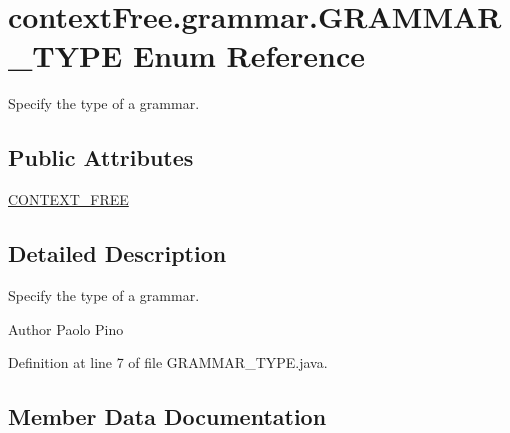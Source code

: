 \hypertarget{enumcontext_free_1_1grammar_1_1_g_r_a_m_m_a_r___t_y_p_e}{\section{context\-Free.\-grammar.\-G\-R\-A\-M\-M\-A\-R\-\_\-\-T\-Y\-P\-E Enum Reference}
\label{enumcontext_free_1_1grammar_1_1_g_r_a_m_m_a_r___t_y_p_e}
}


Specify the type of a grammar.  


\subsection*{Public Attributes}
\begin{DoxyCompactItemize}
\item 
\hyperlink{enumcontext_free_1_1grammar_1_1_g_r_a_m_m_a_r___t_y_p_e_a1716ccff248a4c662919f646073266e2}{C\-O\-N\-T\-E\-X\-T\-\_\-\-F\-R\-E\-E}
\end{DoxyCompactItemize}


\subsection{Detailed Description}
Specify the type of a grammar. 

\begin{DoxyAuthor}{Author}
Paolo Pino 
\end{DoxyAuthor}


Definition at line 7 of file G\-R\-A\-M\-M\-A\-R\-\_\-\-T\-Y\-P\-E.\-java.



\subsection{Member Data Documentation}
\hypertarget{enumcontext_free_1_1grammar_1_1_g_r_a_m_m_a_r___t_y_p_e_a1716ccff248a4c662919f646073266e2}{
\subsubsection[{C\-O\-N\-T\-E\-X\-T\-\_\-\-F\-R\-E\-E}]{}}\label{enumcontext_free_1_1grammar_1_1_g_r_a_m_m_a_r___t_y_p_e_a1716ccff248a4c662919f646073266e2}


